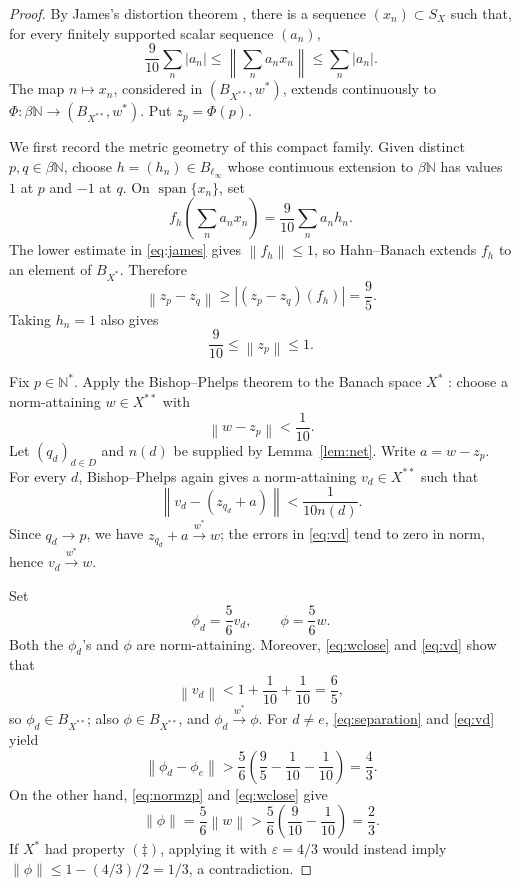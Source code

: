 \documentclass[11pt]{article}
\newcommand{\norm}[1]{\left\lVert #1\right\rVert}
\newcommand{\N}{\mathbb N}
\begin{document}
\begin{proof}
By James's distortion theorem \cite{James,DowlingEtAl}, there is a sequence
\((x_n)\subset S_X\) such that, for every finitely supported scalar sequence
\((a_n)\),
\begin{equation}\label{eq:james}
 \frac9{10}\sum_n|a_n|
 \leq \norm{\sum_n a_nx_n}
 \leq \sum_n|a_n|.
\end{equation}
The map \(n\mapsto x_n\), considered in
\((B_{X^{**}},w^*)\), extends continuously to
\(\Phi:\beta\N\to(B_{X^{**}},w^*)\).  Put \(z_p=\Phi(p)\).

We first record the metric geometry of this compact family.  Given distinct
\(p,q\in\beta\N\), choose \(h=(h_n)\in B_{\ell_\infty}\) whose continuous
extension to \(\beta\N\) has values \(1\) at \(p\) and \(-1\) at \(q\).
On \(\operatorname{span}\{x_n\}\), set
\[
 f_h\!\left(\sum_n a_nx_n\right)
   =\frac9{10}\sum_n a_nh_n.
\]
The lower estimate in \eqref{eq:james} gives \(\norm{f_h}\leq1\), so
Hahn--Banach extends \(f_h\) to an element of \(B_{X^*}\).  Therefore
\begin{equation}\label{eq:separation}
 \norm{z_p-z_q}\geq |(z_p-z_q)(f_h)|=\frac95.
\end{equation}
Taking \(h_n=1\) also gives
\begin{equation}\label{eq:normzp}
 \frac9{10}\leq\norm{z_p}\leq1.
\end{equation}

Fix \(p\in\N^*\).  Apply the Bishop--Phelps theorem to the Banach space
\(X^*\) \cite{BishopPhelps}: choose a norm-attaining
\(w\in X^{**}\) with
\begin{equation}\label{eq:wclose}
 \norm{w-z_p}<\frac1{10}.
\end{equation}
Let \((q_d)_{d\in D}\) and \(n(d)\) be supplied by Lemma~\ref{lem:net}.
Write \(a=w-z_p\).  For every \(d\), Bishop--Phelps again gives a
norm-attaining \(v_d\in X^{**}\) such that
\begin{equation}\label{eq:vd}
 \norm{v_d-(z_{q_d}+a)}<\frac1{10n(d)}.
\end{equation}
Since \(q_d\to p\), we have \(z_{q_d}+a\xrightarrow{w^*}w\); the errors in
\eqref{eq:vd} tend to zero in norm, hence \(v_d\xrightarrow{w^*}w\).

Set
\[
 \phi_d=\frac56v_d,\qquad \phi=\frac56w.
\]
Both the \(\phi_d\)'s and \(\phi\) are norm-attaining.  Moreover,
\eqref{eq:wclose} and \eqref{eq:vd} show that
\[
 \norm{v_d}<1+\frac1{10}+\frac1{10}=\frac65,
\]
so \(\phi_d\in B_{X^{**}}\); also \(\phi\in B_{X^{**}}\), and
\(\phi_d\xrightarrow{w^*}\phi\).  For \(d\ne e\),
\eqref{eq:separation} and
\eqref{eq:vd} yield
\[
 \norm{\phi_d-\phi_e}
 >\frac56\left(\frac95-\frac1{10}-\frac1{10}\right)
 =\frac43.
\]
On the other hand, \eqref{eq:normzp} and \eqref{eq:wclose} give
\[
 \norm\phi=\frac56\norm w
 >\frac56\left(\frac9{10}-\frac1{10}\right)=\frac23.
\]
If \(X^*\) had property \((\ddagger)\), applying it with
\(\varepsilon=4/3\) would instead imply
\(\norm\phi\leq1-(4/3)/2=1/3\), a contradiction.
\end{proof}
\end{document}
